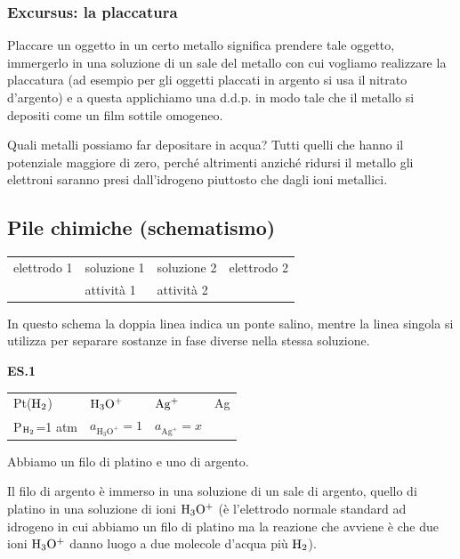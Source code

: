 \subsubsection{Excursus: la placcatura}
Placcare un oggetto in un certo metallo significa prendere tale oggetto, immergerlo in una soluzione di un sale del metallo con cui vogliamo realizzare la placcatura (ad esempio per gli oggetti placcati in argento si usa il nitrato d'argento) e a questa applichiamo una d.d.p. in modo tale che il metallo si depositi come un film sottile omogeneo.

Quali metalli possiamo far depositare in acqua? Tutti quelli che hanno il potenziale maggiore di zero, perché altrimenti anziché ridursi il metallo gli elettroni saranno presi dall'idrogeno piuttosto che dagli ioni metallici.

\subsection{Pile chimiche (schematismo)}
\begin{center}
    \begin{tabular}{p{2cm}|p{2cm}||p{2cm}|p{2cm}}
        \vspace{0.3cm}elettrodo 1 & soluzione 1 & soluzione 2 & \vspace{0.3cm}elettrodo 2\\
        & attività 1 & attività 2 &
    \end{tabular}
\end{center}

In questo schema la doppia linea indica un ponte salino, mentre la linea singola si utilizza per separare sostanze in fase diverse nella stessa soluzione.

\vspace{0.2cm}\textbf{ES.1}
\begin{center}
    \begin{tabular}{p{2.3cm}|p{2cm}||p{1.8cm}|p{2cm}}
        Pt($\rm H_2$) & $\rm H_3O^+$ & $\rm Ag^+$ & Ag\\[0.5ex]
        P$\rm _{H_2}$=1 atm & $a_{\text{H}_3\text{O}^+}=1$ & $a_{\text{Ag}^+}=x$&\\[0.5ex]
    \end{tabular}
\end{center}

Abbiamo un filo di platino e uno di argento.

Il filo di argento è immerso in una soluzione di un sale di argento, quello di platino in una soluzione di ioni $\rm H_3O^+$ (è l'elettrodo normale standard ad idrogeno in cui abbiamo un filo di platino ma la reazione che avviene è che due ioni $\rm H_3O^+$ danno luogo a due molecole d'acqua più $\rm H_2$).

